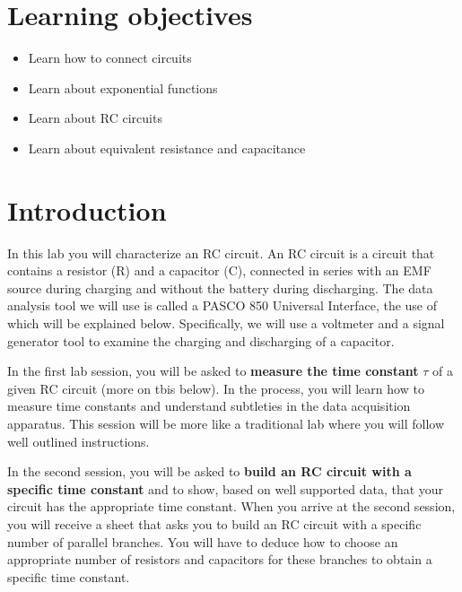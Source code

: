 \documentclass[12pt]{report}
\begin{document}
\section{Learning objectives}
\begin{itemize}
\item Learn how to connect circuits
\item Learn about exponential functions
\item Learn about RC circuits
\item Learn about equivalent resistance and capacitance
\end{itemize}

\section{Introduction}
In this lab you will characterize an RC circuit. An RC circuit is a circuit that contains a resistor (R) and a capacitor (C), connected in series with an EMF source during charging and without the battery during discharging.  
The data analysis tool we will use is called a PASCO 850 Universal Interface, the use of which will be explained below. 
Specifically, we will  use a voltmeter and a 
signal generator tool to examine the charging and discharging of a capacitor. 

In the first lab session, you will be asked to \textbf{measure the time constant} $\tau$ of a given RC circuit (more on tbis below). 
In the process, you will learn how to measure time constants and understand subtleties in the data acquisition apparatus. 
This session will be more like a traditional lab where you will follow well outlined instructions. 

In the second session, you will be asked to \textbf{build an RC circuit with a specific time constant} and to show, based on well supported data, that your circuit has the appropriate time constant. 
When you arrive at the second session, you will receive a sheet that asks you to build an RC circuit with a specific number of parallel branches. 
You will have to deduce how to choose an appropriate number of resistors and capacitors for these branches to obtain a specific time constant.
\end{document}

